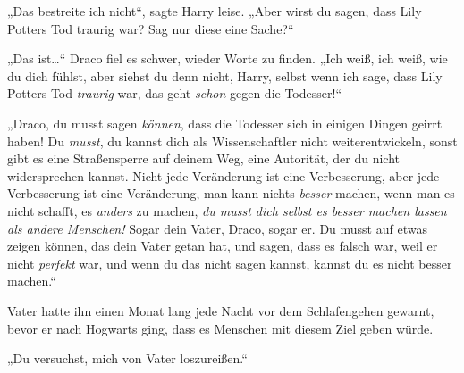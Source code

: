 „Das bestreite ich nicht“, sagte Harry leise. „Aber wirst du sagen, dass Lily Potters Tod traurig war? Sag nur diese eine Sache?“

„Das ist…“ Draco fiel es schwer, wieder Worte zu finden. „Ich weiß, ich weiß, wie du dich fühlst, aber siehst du denn nicht, Harry, selbst wenn ich sage, dass Lily Potters Tod \emph{traurig} war, das geht \emph{schon} gegen die Todesser!“

„Draco, du musst sagen \emph{können}, dass die Todesser sich in einigen Dingen geirrt haben! Du \emph{musst}, du kannst dich als Wissenschaftler nicht weiterentwickeln, sonst gibt es eine Straßensperre auf deinem Weg, eine Autorität, der du nicht widersprechen kannst. Nicht jede Veränderung ist eine Verbesserung, aber jede Verbesserung ist eine Veränderung, man kann nichts \emph{besser} machen, wenn man es nicht schafft, es \emph{anders} zu machen, \emph{du musst dich selbst es besser machen lassen als andere Menschen!} Sogar dein Vater, Draco, sogar er. Du musst auf etwas zeigen können, das dein Vater getan hat, und sagen, dass es falsch war, weil er nicht \emph{perfekt} war, und wenn du das nicht sagen kannst, kannst du es nicht besser machen.“

Vater hatte ihn einen Monat lang jede Nacht vor dem Schlafengehen gewarnt, bevor er nach Hogwarts ging, dass es Menschen mit diesem Ziel geben würde.

„Du versuchst, mich von Vater loszureißen.“

